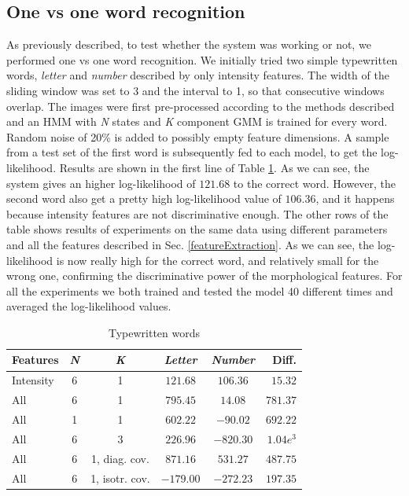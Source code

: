 \documentclass[conference]{IEEEtran}
\begin{document}
\subsection{One vs one word recognition} \label{SubS:1vs1}
As previously described, to test whether the system was working or not, we performed one vs one word recognition. We initially tried two simple typewritten words, {\it letter} and {\it number } described by only intensity features. The width of the sliding window was set to 3 and the interval to 1, so that consecutive windows overlap. The images were first pre-processed according to the methods described and an HMM with {\it N} states and {\it K} component GMM is trained for every word. Random noise of 20\% is added to possibly empty feature dimensions. A sample from a test set of the first word is subsequently fed to each model, to get the log-likelihood. Results are shown in the first line of Table \ref{Table:1vs1-1}. As we can see, the system gives an higher log-likelihood of $121.68$  to the correct word. However, the second word also get a pretty high log-likelihood value of $106.36$, and it happens because intensity features are not discriminative enough. The other rows of the table shows results of experiments on the same data using different parameters and all the features described in Sec. \ref{featureExtraction}. As we can see, the log-likelihood is now really high for the correct word, and relatively small for the wrong one, confirming the discriminative power of the morphological features.
For all the experiments we both trained and tested the model 40 different times and averaged the log-likelihood values.
\begin{table}[H]
 \caption{Typewritten words}
 \label{Table:1vs1-1}
  \begin{tabular}{|l|c|c|c|c|r|}\hline
    Features 	& {\it N} 	& {\it K} 			& {\it Letter}	& {\it Number} 	& Diff. 	\\\hline
    Intensity 	& 6	& 1 			& $121.68$ 	& $106.36$ 	& $15.32$	\\
    All		& 6  	& 1 			& $795.45$ 	& $14.08$  	& $781.37$	\\
    All 	& 1	& 1 			& $602.22$ 	& $-90.02$ 	& $692.22$	\\
    All 	& 6 	& 3 			& $226.96$ 	& $-820.30$ 	& $1.04e^{3}$	\\
    All 	& 6 	& 1,  diag. cov. 	& $871.16$ 	& $531.27$ 	& $487.75$	\\
    All 	& 6 	& 1,  isotr. cov. 	& $-179.00$ 	& $-272.23$ 	& $197.35$	\\\hline
\end{tabular}
\end{table}
\end{document}
